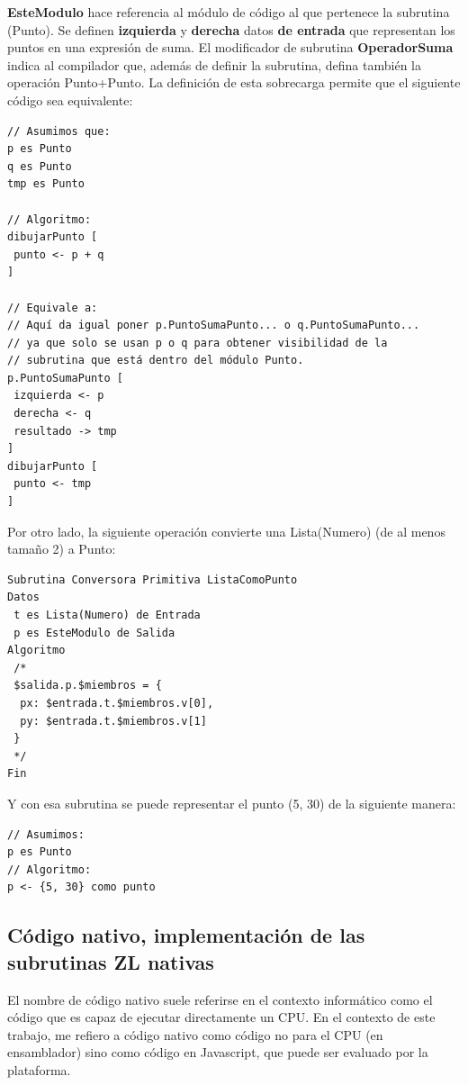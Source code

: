 \documentclass{report}
\begin{document}
	\textbf{EsteModulo} hace referencia al módulo de código al que pertenece la subrutina (Punto). Se definen \textbf{izquierda} y \textbf{derecha} datos \textbf{de entrada} que representan los puntos en una expresión de suma. El modificador de subrutina \textbf{OperadorSuma} indica al compilador que, además de definir la subrutina, defina también la operación Punto+Punto. La definición de esta sobrecarga permite que el siguiente código sea equivalente:
	
	\begin{BVerbatim}
// Asumimos que:
p es Punto
q es Punto
tmp es Punto

// Algoritmo:
dibujarPunto [
 punto <- p + q
]

// Equivale a:
// Aquí da igual poner p.PuntoSumaPunto... o q.PuntoSumaPunto...
// ya que solo se usan p o q para obtener visibilidad de la 
// subrutina que está dentro del módulo Punto.
p.PuntoSumaPunto [
 izquierda <- p
 derecha <- q
 resultado -> tmp
]
dibujarPunto [
 punto <- tmp
]
	\end{BVerbatim}
	
	Por otro lado, la siguiente operación convierte una Lista(Numero) (de al menos tamaño 2) a Punto:
	
	\begin{BVerbatim}
Subrutina Conversora Primitiva ListaComoPunto
Datos
 t es Lista(Numero) de Entrada
 p es EsteModulo de Salida
Algoritmo
 /*
 $salida.p.$miembros = {
  px: $entrada.t.$miembros.v[0],
  py: $entrada.t.$miembros.v[1]
 }
 */
Fin
	\end{BVerbatim}
	
	\vspace{10px}
	\noindent
	Y con esa subrutina se puede representar el punto (5, 30) de la siguiente manera:
	
	\vspace{10px}
	
	\begin{BVerbatim}
// Asumimos:
p es Punto
// Algoritmo:
p <- {5, 30} como punto
	\end{BVerbatim}
	
	\subsection{Código nativo, implementación de las subrutinas ZL nativas}
	
	El nombre de código nativo suele referirse en el contexto informático como el código que es capaz de ejecutar directamente un CPU. En el contexto de este trabajo, me refiero a código nativo como código no para el CPU (en ensamblador) sino como código en Javascript, que puede ser evaluado por la plataforma. 
	
\end{document}
